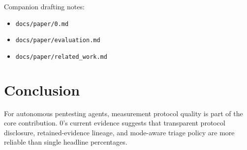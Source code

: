 \documentclass[11pt]{article}
\begin{document}
Companion drafting notes:

\begin{itemize}
  \item \texttt{docs/paper/0.md}
  \item \texttt{docs/paper/evaluation.md}
  \item \texttt{docs/paper/related\_work.md}
\end{itemize}

\section{Conclusion}

For autonomous pentesting agents, measurement protocol quality is part of the
core contribution. 0's current evidence suggests that transparent protocol
disclosure, retained-evidence lineage, and mode-aware triage policy are more
reliable than single headline percentages.



\end{document}
